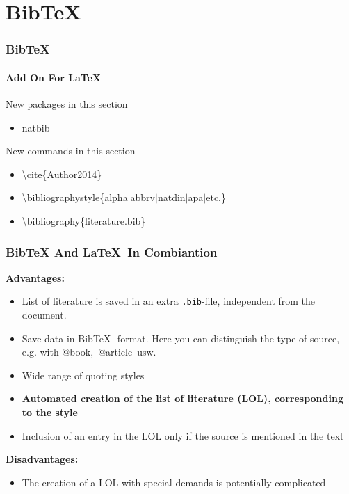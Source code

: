 \section{BibTeX}
\begin{frame}
\frametitle{BibTeX}
\framesubtitle{Add On For \LaTeX}
\begin{exampleblock}{New packages in this section}
\begin{itemize}
\item natbib
\end{itemize}
\end{exampleblock}

\begin{block}{New commands in this section}
\begin{itemize}
\item \color{nounibaredI}\textbackslash cite\color{black}\{Author2014\}
\item \color{nounibaredI}\textbackslash bibliographystyle\color{black}\{alpha$\mid$abbrv$\mid$natdin$\mid$apa$\mid$etc.\}
\item \color{nounibaredI}\textbackslash bibliography\color{black}\{literature.bib\}
\end{itemize}
\end{block}
\end{frame}

\begin{frame}
\frametitle{BibTeX And \LaTeX ~In Combiantion}
\textbf{Advantages:}
\begin{itemize}
\item List of literature is saved in an extra \texttt{.bib}-file, independent from the document.
\item Save data in BibTeX -format. Here you can distinguish the type of source, e.g. with \color{nounibaredI}$@$book\color{black},~\color{nounibaredI}$@$article\color{black}~usw.
\item Wide range of quoting styles
\item \textbf{Automated creation of the list of literature (LOL), corresponding to the style}
\item Inclusion of an entry in the LOL only if the source is mentioned in the text
\end{itemize}
\textbf{Disadvantages:}
\begin{itemize}
\item The creation of a LOL with special demands is potentially complicated
\end{itemize}
\end{frame}

